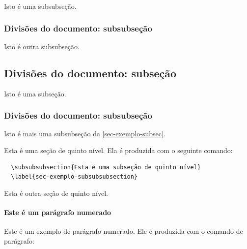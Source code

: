 \documentclass[12pt,oneside,a4paper,chapter=TITLE,english,brazil]{abntex2}
\begin{document}
\begin{anexosenv}
Isto é uma subsubseção.

\subsubsection{Divisões do documento: subsubseção}

Isto é outra subsubseção.

\subsection{Divisões do documento: subseção}\label{sec-exemplo-subsec}

Isto é uma subseção.

\subsubsection{Divisões do documento: subsubseção}

Isto é mais uma subsubseção da \autoref{sec-exemplo-subsec}.


\label{sec-exemplo-subsubsubsection}

Esta é uma seção de quinto nível. Ela é produzida com o seguinte comando:
\begin{verbatim}
  \subsubsubsection{Esta é uma subseção de quinto nível}
  \label{sec-exemplo-subsubsubsection}
\end{verbatim}

\label{sec-exemplo-subsubsubsection-outro}

Esta é outra seção de quinto nível.

\paragraph{Este é um parágrafo numerado}\label{sec-exemplo-paragrafo}

Este é um exemplo de parágrafo numerado. Ele é produzida com o comando de parágrafo:
\begin{verbatim}

\end{verbatim}
\end{anexosenv}
\end{document}
